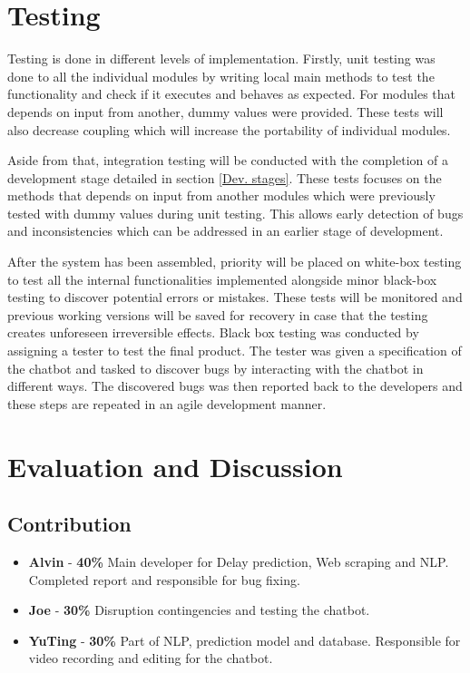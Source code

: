 \documentclass[11pt]{article}
\begin{document}
\section{Testing}
Testing is done in different levels of implementation. Firstly, unit testing was done to all the individual modules by writing local main methods to test the functionality and check if it executes and behaves as expected. For modules that depends on input from another, dummy values were provided. These tests will also decrease coupling which will increase the portability of individual modules.

Aside from that, integration testing will be conducted with the completion of a development stage detailed in section \ref{Dev. stages}. These tests focuses on the methods that depends on input from another modules which were previously tested with dummy values during unit testing. This allows early detection of bugs and inconsistencies which can be addressed in an earlier stage of development.

After the system has been assembled, priority will be placed on white-box testing to test all the internal functionalities implemented alongside minor black-box testing to discover potential errors or mistakes. These tests will be monitored and previous working versions will be saved for recovery in case that the testing creates unforeseen irreversible effects. Black box testing was conducted by assigning a tester to test the final product. The tester was given a specification of the chatbot and tasked to discover bugs by interacting with the chatbot in different ways. The discovered bugs was then reported back to the developers and these steps are repeated in an agile development manner. 

\section{Evaluation and Discussion}
\subsection{Contribution}
\begin{itemize}
	\item \textbf{Alvin}  - \textbf{40\%} Main developer for Delay prediction, Web scraping and NLP. Completed report and responsible for bug fixing.
	\item \textbf{Joe}    - \textbf{30\%} Disruption contingencies and testing the chatbot.
	\item \textbf{YuTing} - \textbf{30\%} Part of NLP, prediction model and database. Responsible for video recording and editing for the chatbot.
\end{itemize}
\end{document}
